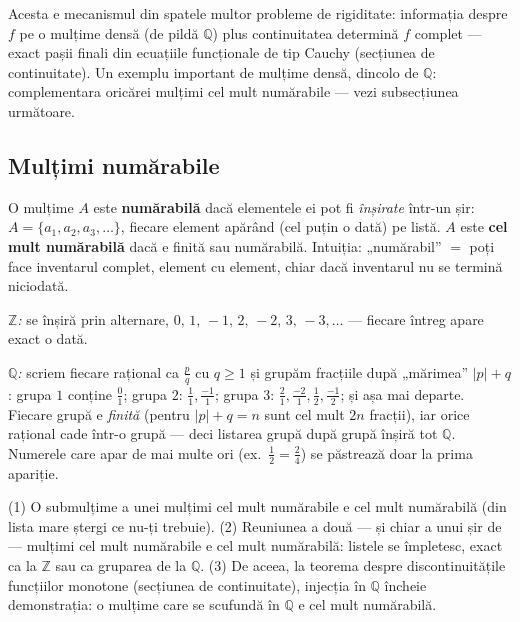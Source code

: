 \begin{obs}
Acesta e mecanismul din spatele multor probleme de rigiditate: informația despre $f$ pe o mulțime densă (de pildă $\mathbb{Q}$) plus continuitatea determină $f$ complet --- exact pașii finali din ecuațiile funcționale de tip Cauchy (secțiunea de continuitate). Un exemplu important de mulțime densă, dincolo de $\mathbb{Q}$: complementara oricărei mulțimi cel mult numărabile --- vezi subsecțiunea următoare.
\end{obs}

\subsection{Mulțimi numărabile}

\begin{definitie}
O mulțime $A$ este \textbf{numărabilă} dacă elementele ei pot fi \emph{înșirate} într-un șir: $A=\{a_1,a_2,a_3,\dots\}$, fiecare element apărând (cel puțin o dată) pe listă. $A$ este \textbf{cel mult numărabilă} dacă e finită sau numărabilă. Intuiția: „numărabil'' $=$ poți face inventarul complet, element cu element, chiar dacă inventarul nu se termină niciodată.
\end{definitie}

\begin{propozitie}
\emph{$\mathbb{Z}$:} se înșiră prin alternare, $0,\,1,\,-1,\,2,\,-2,\,3,\,-3,\dots$ --- fiecare întreg apare exact o dată.

\emph{$\mathbb{Q}$:} scriem fiecare rațional ca $\frac pq$ cu $q\ge1$ și grupăm fracțiile după „mărimea'' $|p|+q$: grupa $1$ conține $\frac01$; grupa $2$: $\frac11,\frac{-1}{1}$; grupa $3$: $\frac21,\frac{-2}{1},\frac12,\frac{-1}{2}$; și așa mai departe. Fiecare grupă e \emph{finită} (pentru $|p|+q=n$ sunt cel mult $2n$ fracții), iar orice rațional cade într-o grupă --- deci listarea grupă după grupă înșiră tot $\mathbb{Q}$. Numerele care apar de mai multe ori (ex.\ $\frac12=\frac24$) se păstrează doar la prima apariție.
\end{propozitie}

\begin{obs}
(1) O submulțime a unei mulțimi cel mult numărabile e cel mult numărabilă (din lista mare ștergi ce nu-ți trebuie). (2) Reuniunea a două --- și chiar a unui șir de --- mulțimi cel mult numărabile e cel mult numărabilă: listele se împletesc, exact ca la $\mathbb{Z}$ sau ca gruparea de la $\mathbb{Q}$. (3) De aceea, la teorema despre discontinuitățile funcțiilor monotone (secțiunea de continuitate), injecția în $\mathbb{Q}$ încheie demonstrația: o mulțime care se scufundă în $\mathbb{Q}$ e cel mult numărabilă.
\end{obs}

